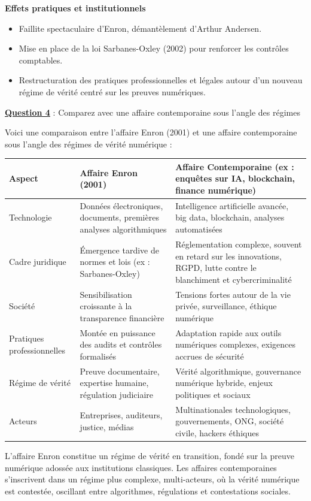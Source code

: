 \documentclass[12pt, a4paper]{article}
\newcommand{\question}[1]{\textbf{\underline{Question #1}}}
\begin{document}
\begin{enumerate}[label=\textbf{\arabic*.}]
		\textbf{Effets pratiques et institutionnels}
		\begin{itemize}
			\item Faillite spectaculaire d'Enron, démantèlement d'Arthur Andersen.
			\item Mise en place de la loi Sarbanes-Oxley (2002) pour renforcer les contrôles comptables.
			\item Restructuration des pratiques professionnelles et légales autour d'un nouveau régime de vérité centré sur les preuves numériques.
		\end{itemize}
		
		\question{4} : Comparez avec une affaire contemporaine sous l'angle des régimes
		
		Voici une comparaison entre l'affaire Enron (2001) et une affaire contemporaine sous l'angle des régimes de vérité numérique :
		
		\begin{tabular}{|p{3cm}|p{5.5cm}|p{5.5cm}|}
			\hline
			\textbf{Aspect} & \textbf{Affaire Enron (2001)} & \textbf{Affaire Contemporaine (ex : enquêtes sur IA, blockchain, finance numérique)} \\
			\hline
			Technologie & Données électroniques, documents, premières analyses algorithmiques & Intelligence artificielle avancée, big data, blockchain, analyses automatisées \\
			\hline
			Cadre juridique & Émergence tardive de normes et lois (ex : Sarbanes-Oxley) & Réglementation complexe, souvent en retard sur les innovations, RGPD, lutte contre le blanchiment et cybercriminalité \\
			\hline
			Société & Sensibilisation croissante à la transparence financière & Tensions fortes autour de la vie privée, surveillance, éthique numérique \\
			\hline
			Pratiques professionnelles & Montée en puissance des audits et contrôles formalisés & Adaptation rapide aux outils numériques complexes, exigences accrues de sécurité \\
			\hline
			Régime de vérité & Preuve documentaire, expertise humaine, régulation judiciaire & Vérité algorithmique, gouvernance numérique hybride, enjeux politiques et sociaux \\
			\hline
			Acteurs & Entreprises, auditeurs, justice, médias & Multinationales technologiques, gouvernements, ONG, société civile, hackers éthiques \\
			\hline
		\end{tabular}
		
		L'affaire Enron constitue un régime de vérité en transition, fondé sur la preuve numérique adossée aux institutions classiques. Les affaires contemporaines s'inscrivent dans un régime plus complexe, multi-acteurs, où la vérité numérique est contestée, oscillant entre algorithmes, régulations et contestations sociales.
	\end{enumerate}
	
\end{document}
